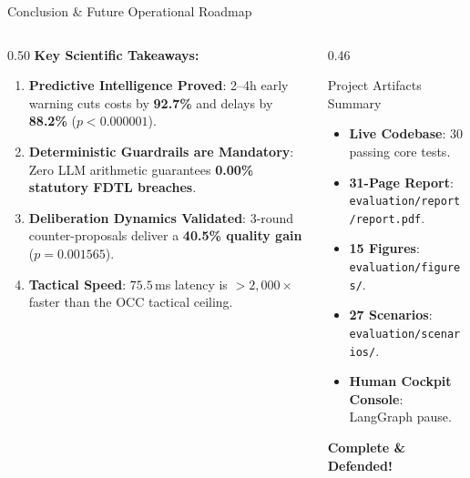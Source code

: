 \documentclass[aspectratio=169,10pt]{beamer}
\begin{document}
\begin{frame}{Conclusion \& Future Operational Roadmap}
  \begin{columns}[t]
    \begin{column}{0.50\textwidth}
      \textbf{Key Scientific Takeaways:}
      \begin{enumerate}\footnotesize
        \item \textbf{Predictive Intelligence Proved}: 2--4h early warning cuts costs by \textbf{92.7\%} and delays by \textbf{88.2\%} ($p < 0.000001$).
        \item \textbf{Deterministic Guardrails are Mandatory}: Zero LLM arithmetic guarantees \textbf{0.00\% statutory FDTL breaches}.
        \item \textbf{Deliberation Dynamics Validated}: 3-round counter-proposals deliver a \textbf{40.5\% quality gain} ($p = 0.001565$).
        \item \textbf{Tactical Speed}: $75.5\,$ms latency is $>2,000\times$ faster than the OCC tactical ceiling.
      \end{enumerate}
    \end{column}
    \begin{column}{0.46\textwidth}
      \begin{block}{Project Artifacts Summary}
        \begin{itemize}\footnotesize
          \item \textbf{Live Codebase}: 30 passing core tests.
          \item \textbf{31-Page Report}: \texttt{evaluation/report/report.pdf}.
          \item \textbf{15 Figures}: \texttt{evaluation/figures/}.
          \item \textbf{27 Scenarios}: \texttt{evaluation/scenarios/}.
          \item \textbf{Human Cockpit Console}: LangGraph pause.
        \end{itemize}
      \end{block}
      \centering\vspace{0.08in}
      \textbf{\color{EmeraldGreen}\Large Complete \& Defended!}
    \end{column}
  \end{columns}
\end{frame}
\end{document}
